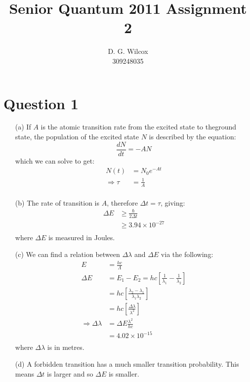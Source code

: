\documentclass[10pt,a4paper]{article}
\title{Senior Quantum 2011 Assignment 2}
\date{}
\author{D. G. Wilcox \\
		309248035}
\begin{document}
\maketitle
\section*{Question 1}
\begin{itemize}
	\item[(a)] If $A$ is the atomic transition rate from the excited state to theground state, the population of the excited state $N$ is described by the equation:
		\begin{equation*}
			\frac{dN}{dt} = - A N
		\end{equation*}
	which we can solve to get:
		\begin{align*}
			N(t) &= N_{0}e^{-At} \\
			\Rightarrow \tau &= \frac{1}{A} \\
		\end{align*}
	
	\item[(b)] The rate of transition is $A$, therefore $\Delta t = \tau$, giving:
		\begin{align*}
			\Delta E &\geq \frac{\hbar}{2 \Delta t} \\
			&\geq 3.94 \times 10^{-27} \\
		\end{align*}
	where $\Delta E$ is measured in Joules.

	\item[(c)] We can find a relation between $\Delta \lambda$ and $\Delta E$ via the following:
		\begin{align*}
			E &= \frac{hc}{\Lambda} \\
			\Delta E &= E_{1} - E_{2} = hc [\frac{1}{\lambda_{1}} - \frac{1}{\lambda_{2}}] \\
			&= hc [\frac{\lambda_{2} - \lambda_{1}}{\lambda_{1}\lambda_{2}}] \\
			&= hc [\frac{\Delta \lambda}{\lambda^{2}}] \\
			\Rightarrow \Delta \lambda &= \Delta E \frac{\lambda^{2}}{hc} \\
			&= 4.02 \times 10^{-15} \\
		\end{align*}
	where $\Delta \lambda$ is in metres.

	\item[(d)] A forbidden transition has a much smaller transition probability. This means $\Delta t$ is larger and so $\Delta E$ is smaller.
\end{itemize}
\end{document}
